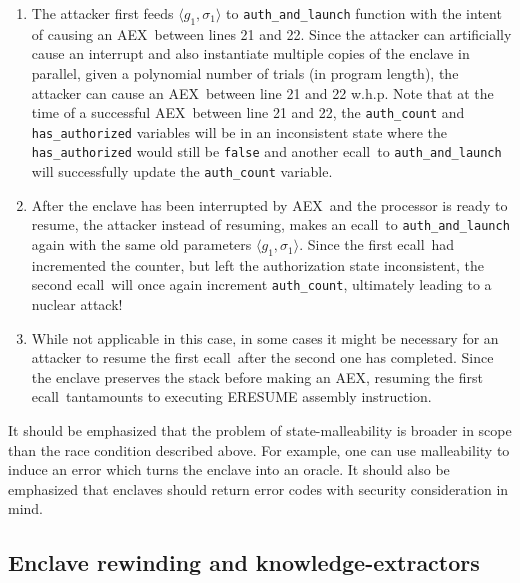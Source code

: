 \documentclass[letterpaper]{article}
\newcommand{\ecall}{\textsf{ecall}}
\newcommand{\aex}{\textsf{AEX}}
\begin{document}
  \begin{enumerate}
  \item The attacker first feeds $\langle g_1, \sigma_1 \rangle$ to
    \texttt{auth\_and\_launch} function with the intent of causing an
    \aex\ between lines 21 and 22. Since the attacker can artificially
    cause an interrupt and also instantiate multiple copies of the
    enclave in parallel, given a polynomial number of trials (in
    program length), the attacker can cause an \aex\ between line 21
    and 22 w.h.p. Note that at the time of a successful \aex\ between
    line 21 and 22, the \texttt{auth\_count} and
    \texttt{has\_authorized} variables will be in an inconsistent
    state where the \texttt{has\_authorized} would still be
    \texttt{false} and another \ecall\ to \texttt{auth\_and\_launch}
    will successfully update the \texttt{auth\_count} variable.

  \item After the enclave has been interrupted by \aex\ and the
    processor is ready to resume, the attacker instead of resuming,
    makes an \ecall\ to \texttt{auth\_and\_launch} again with the same
    old parameters $\langle g_1, \sigma_1 \rangle$. Since the first
    \ecall\ had incremented the counter, but left the authorization
    state inconsistent, the second \ecall\ will once again increment
    \texttt{auth\_count}, ultimately leading to a nuclear attack!

  \item While not applicable in this case, in some cases it might be
    necessary for an attacker to resume the first \ecall\ after the
    second one has completed. Since the enclave preserves the stack
    before making an \aex, resuming the first \ecall\ tantamounts to
    executing \textsf{ERESUME} assembly instruction.

  \end{enumerate}

  It should be emphasized that the problem of state-malleability is
  broader in scope than the race condition described above. For
  example, one can use malleability to induce an error which turns the
  enclave into an oracle. It should also be emphasized that enclaves
  should return error codes with security consideration in mind.

  \subsection{Enclave rewinding and knowledge-extractors}
  \label{ssec:rewind}
\end{document}

